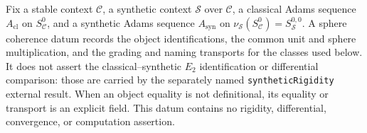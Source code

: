 \begin{definition}
  \label{def:sphere-adams-coherence}
  \notready
  Fix a stable context $\mathcal C$, a synthetic context $\mathcal S$ over
  $\mathcal C$, a classical Adams sequence $A_{\mathrm{cl}}$ on
  $S^0_{\mathcal C}$, and a synthetic Adams sequence $A_{\mathrm{syn}}$ on
  $\nu_{\mathcal S}(S^0_{\mathcal C})=S^{0,0}_{\mathcal S}$.  A sphere
  coherence datum records the object identifications, the common unit and
  sphere multiplication, and the grading and naming transports for the classes
  used below.  It does not assert the classical--synthetic $E_2$ identification
  or differential comparison: those are carried by the separately named
  \texttt{syntheticRigidity} external result.  When an object equality is not
  definitional, its equality or transport is an explicit field.  This datum
  contains no rigidity, differential, convergence, or computation assertion.
\end{definition}

